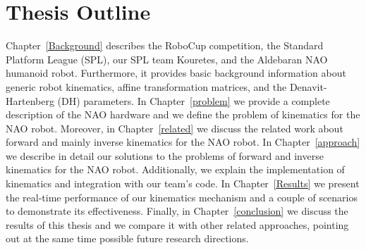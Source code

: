 \section{Thesis Outline}
Chapter~\ref{Background} describes the RoboCup competition, the Standard Platform League (SPL), our SPL team Kouretes, and the Aldebaran NAO humanoid robot. Furthermore, it provides basic background information about  generic robot kinematics, affine transformation matrices, and the Denavit-Hartenberg (DH) parameters. In Chapter~\ref{problem} we provide a complete description of the NAO hardware and we define the problem of kinematics for the NAO robot. Moreover, in Chapter~\ref{related} we discuss the related work about forward and mainly inverse kinematics for the NAO robot. In Chapter~\ref{approach} we describe in detail our solutions to the problems of forward and inverse kinematics for the NAO robot. Additionally, we explain the implementation of kinematics and integration with our team's code. In Chapter~\ref{Results} we present the real-time performance of our kinematics mechanism and a couple of scenarios to demonstrate its effectiveness. Finally, in Chapter~\ref{conclusion} we discuss the results of this thesis and we compare it with other related approaches, pointing out at the same time possible future research directions.

